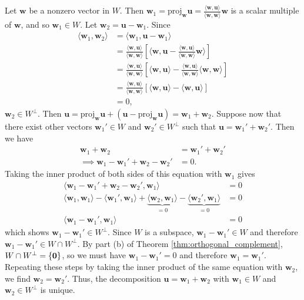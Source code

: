 \documentclass[12pt,letterpaper,reqno]{article}
\numberwithin{equation}{section}
\newcommand{\bw}{\mathbf{w}}
\newcommand{\bu}{\mathbf{u}}
\begin{document}
\begin{pf}
	Let $\bw$ be a nonzero vector in $W$. Then $\bw_1=\text{proj}_{\bw}\bu =\frac{\langle \bw,\bu \rangle}{\langle \bw,\bw \rangle}\bw$ is a scalar multiple of $\bw$, and so $\bw_1 \in W$. Let $\bw_2=\bu-\bw_1$. Since 
	\begin{align*}
		\langle \bw_1,\bw_2\rangle &=\langle \bw_1,\bu-\bw_1\rangle \\
		&=\frac{\langle \bw,\bu \rangle}{\langle \bw,\bw \rangle}\left[\langle \bw,\bu-\frac{\langle \bw,\bu \rangle}{\langle \bw,\bw \rangle}\bw\rangle\right] \\
		&=\frac{\langle \bw,\bu \rangle}{\langle \bw,\bw \rangle}\left[\langle \bw,\bu\rangle -\frac{\langle \bw,\bu \rangle}{\langle \bw,\bw \rangle}\langle\bw,\bw\rangle\right] \\
		&=\frac{\langle \bw,\bu \rangle}{\langle \bw,\bw \rangle}\left[\langle \bw,\bu\rangle -\langle\bw,\bu\rangle\right] \\
		&=0,
	\end{align*}
	$\bw_2 \in W^\perp$. Then $\bu=\text{proj}_{\bw}\bu+(\bu-\text{proj}_{\bw}\bu)=\bw_1+\bw_2$. Suppose now that there exist other vectors $\bw_1' \in W$ and $\bw_2' \in W^\perp$ such that $\bu=\bw_1'+\bw_2'$. Then we have
	\begin{align*}
		\bw_1+\bw_2&=\bw_1'+\bw_2' \\
		\implies \bw_1-\bw_1'+\bw_2-\bw_2'&=0.
	\end{align*}
Taking the inner product of both sides of this equation with $\bw_1$ gives
\begin{align*}
	\langle \bw_1-\bw_1'+\bw_2-\bw_2', \bw_1 \rangle &= 0 \\
	\langle \bw_1, \bw_1 \rangle - \langle \bw_1',\bw_1 \rangle+\underbrace{\langle \bw_2, \bw_1 \rangle}_{=0}- \underbrace{\langle \bw_2', \bw_1 \rangle}_{=0} &= 0 \\
\langle \bw_1-\bw_1',\bw_1 \rangle &=0
\end{align*}
which shows $\bw_1-\bw_1' \in W^\perp$. Since $W$ is a subspace,  $\bw_1-\bw_1' \in W$ and therefore $\bw_1-\bw_1' \in W \cap W^\perp$. By part (b) of Theorem \eqref{thm:orthogonal_complement}, $W \cap W^\perp =\{{\bf 0}\}$, so we must have $\bw_1-\bw_1'=0$ and therefore $\bw_1=\bw_1'$. Repeating these steps by taking the inner product of the same equation with $\bw_2$, we find $\bw_2=\bw_2'$. Thus, the decomposition $\bu=\bw_1+\bw_2$ with $\bw_1 \in W$ and $\bw_2 \in W^\perp$ is unique. 
\end{pf}
\end{document}
